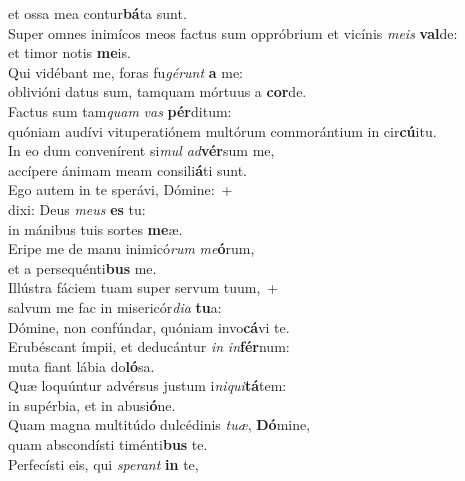 \oddverse et ossa mea contur\textbf{bá}ta sunt.\\
\evenverse Super omnes inimícos meos factus sum oppróbrium et vicínis \textit{me}\textit{is} \textbf{val}de:~\*\\
\evenverse et timor notis \textbf{me}is.\\
\oddverse Qui vidébant me, foras fu\textit{gé}\textit{runt} \textbf{a} me:~\*\\
\oddverse oblivióni datus sum, tamquam mórtuus a \textbf{cor}de.\\
\evenverse Factus sum tam\textit{quam} \textit{vas} \textbf{pér}ditum:~\*\\
\evenverse quóniam audívi vituperatiónem multórum commorántium in cir\textbf{cú}itu.\\
\oddverse In eo dum convenírent si\textit{mul} \textit{ad}\textbf{vér}sum me,~\*\\
\oddverse accípere ánimam meam consili\textbf{á}ti sunt.\\
\evenverse Ego autem in te sperávi, Dómine:~+\\
\evenverse  dixi: Deus \textit{me}\textit{us} \textbf{es} tu:~\*\\
\evenverse in mánibus tuis sortes \textbf{me}æ.\\
\oddverse Eripe me de manu inimicó\textit{rum} \textit{me}\textbf{ó}rum,~\*\\
\oddverse et a persequénti\textbf{bus} me.\\
\evenverse Illústra fáciem tuam super servum tuum,~+\\
\evenverse  salvum me fac in misericór\textit{di}\textit{a} \textbf{tu}a:~\*\\
\evenverse Dómine, non confúndar, quóniam invo\textbf{cá}vi te.\\
\oddverse Erubéscant ímpii, et deducántur \textit{in} \textit{in}\textbf{fér}num:~\*\\
\oddverse muta fiant lábia do\textbf{ló}sa.\\
\evenverse Quæ loquúntur advérsus justum i\textit{ni}\textit{qui}\textbf{tá}tem:~\*\\
\evenverse in supérbia, et in abusi\textbf{ó}ne.\\
\oddverse Quam magna multitúdo dulcédinis \textit{tu}\textit{æ}, \textbf{Dó}mine,~\*\\
\oddverse quam abscondísti timénti\textbf{bus} te.\\
\evenverse Perfecísti eis, qui \textit{spe}\textit{rant} \textbf{in} te,~\*\\
